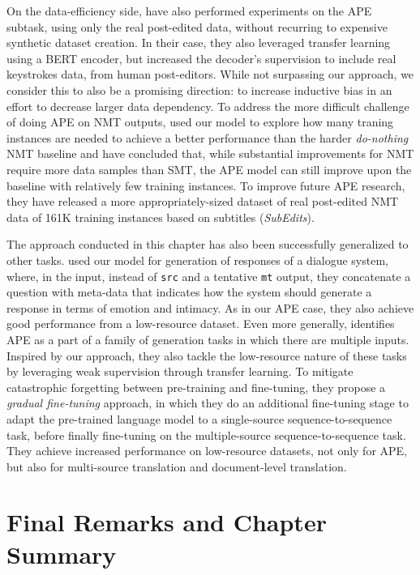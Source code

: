 On the data-efficiency side,
\citet{gois2020LearningNonMonotonicAutomatic} have also performed
experiments on the APE subtask, using only the real post-edited data,
without recurring to expensive synthetic dataset creation. In their
case, they also leveraged transfer learning using a BERT encoder, but
increased the decoder's supervision to include real keystrokes data,
from human post-editors. While not surpassing our approach, we
consider this to also be a promising direction: to increase inductive
bias in an effort to decrease larger data dependency. To address the
more difficult challenge of doing APE on NMT outputs,
\citet{chollampatt2020CanAutomaticPostEditing} used our model to
explore how many traning instances are needed to achieve a better
performance than the harder \emph{do-nothing} NMT baseline and have
concluded that, while substantial improvements for NMT require more
data samples than SMT, the APE model can still improve upon the
baseline with relatively few training instances. To improve future
APE research, they have released a more appropriately-sized dataset
of real post-edited NMT data of 161K training instances based on
subtitles (\emph{SubEdits}).

The approach conducted in this chapter has also been successfully
generalized to other tasks. \citet{kodama2020GeneratingResponsesthat}
used our model for generation of responses of a dialogue system,
where, in the input, instead of \texttt{src} and a tentative
\texttt{mt} output, they concatenate a question with meta-data that
indicates how the system should generate a response in terms of
emotion and intimacy. As in our APE case, they also achieve good
performance from a low-resource dataset. Even more generally,
\citet{huang2021TransferLearningSequence} identifies APE as a part of
a family of generation tasks in which there are multiple inputs.
Inspired by our approach, they also tackle the low-resource nature of
these tasks by leveraging weak supervision through transfer learning.
To mitigate catastrophic forgetting between pre-training and
fine-tuning, they propose a \emph{gradual fine-tuning} approach, in
which they do an additional fine-tuning stage to adapt the
pre-trained language model to a single-source sequence-to-sequence
task, before finally fine-tuning on the multiple-source
sequence-to-sequence task. They achieve increased performance on
low-resource datasets, not only for APE, but also for multi-source
translation and document-level translation.

\section{Final Remarks and Chapter Summary}

